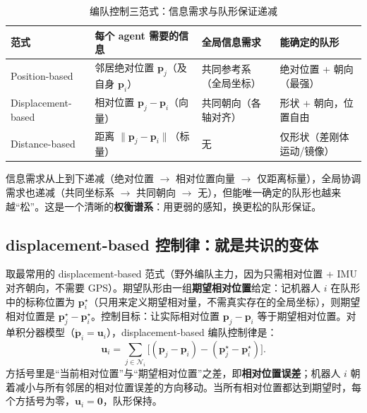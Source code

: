 \begin{table}[H]\centering\small
\caption{编队控制三范式：信息需求与队形保证递减}
\label{tab:cs-three-paradigm}
\begin{tabular}{p{2.4cm}p{3.3cm}p{2.2cm}p{2.8cm}}
\toprule
范式 & 每个 agent 需要的信息 & 全局信息需求 & 能确定的队形 \\
\midrule
Position-based & 邻居绝对位置 $\mathbf{p}_j$（及自身 $\mathbf{p}_i$） & 共同参考系（全局坐标） & 绝对位置 + 朝向（最强） \\
Displacement-based & 相对位置 $\mathbf{p}_j-\mathbf{p}_i$（向量） & 共同朝向（各轴对齐） & 形状 + 朝向，位置自由 \\
Distance-based & 距离 $\|\mathbf{p}_j-\mathbf{p}_i\|$（标量） & 无 & 仅形状（差刚体运动/镜像） \\
\bottomrule
\end{tabular}
\end{table}

\noindent 信息需求从上到下递减（绝对位置 $\to$ 相对位置向量 $\to$ 仅距离标量），全局协调需求也递减（共同坐标系 $\to$ 共同朝向 $\to$ 无），但能唯一确定的队形也越来越“松”。这是一个清晰的\textbf{权衡谱系}：用更弱的感知，换更松的队形保证。

\subsection{displacement-based 控制律：就是共识的变体}
\label{sec:cs-form-displacement}

取最常用的 displacement-based 范式（野外编队主力，因为只需相对位置 + IMU 对齐朝向，不需要 GPS）。期望队形由一组\textbf{期望相对位置}给定：记机器人 $i$ 在队形中的标称位置为 $\mathbf{p}_i^\star$（只用来定义期望相对量，不需真实存在的全局坐标），则期望相对位置是 $\mathbf{p}_j^\star-\mathbf{p}_i^\star$。控制目标：让实际相对位置 $\mathbf{p}_j-\mathbf{p}_i$ 等于期望相对位置。对单积分器模型（$\dot{\mathbf{p}}_i=\mathbf{u}_i$），displacement-based 编队控制律是：
\begin{equation}
  \mathbf{u}_i=\sum_{j\in\mathcal{N}_i}\Big[(\mathbf{p}_j-\mathbf{p}_i)-(\mathbf{p}_j^\star-\mathbf{p}_i^\star)\Big].
  \label{eq:cs-disp-law}
\end{equation}
方括号里是“当前相对位置”与“期望相对位置”之差，即\textbf{相对位置误差}；机器人 $i$ 朝着减小与所有邻居的相对位置误差的方向移动。当所有相对位置都达到期望时，每个方括号为零，$\mathbf{u}_i=\mathbf{0}$，队形保持。

